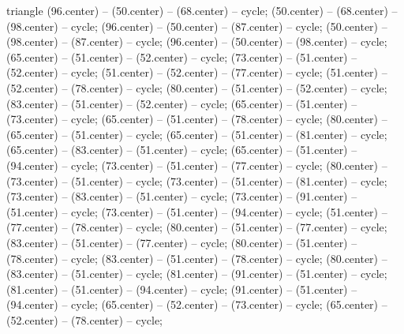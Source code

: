 \begin{pgfonlayer}{triangle}
 (96.center) -- (50.center) -- (68.center) -- cycle; 
 (50.center) -- (68.center) -- (98.center) -- cycle; 
 (96.center) -- (50.center) -- (87.center) -- cycle; 
 (50.center) -- (98.center) -- (87.center) -- cycle; 
 (96.center) -- (50.center) -- (98.center) -- cycle; 
 (65.center) -- (51.center) -- (52.center) -- cycle; 
 (73.center) -- (51.center) -- (52.center) -- cycle; 
 (51.center) -- (52.center) -- (77.center) -- cycle; 
 (51.center) -- (52.center) -- (78.center) -- cycle; 
 (80.center) -- (51.center) -- (52.center) -- cycle; 
 (83.center) -- (51.center) -- (52.center) -- cycle; 
 (65.center) -- (51.center) -- (73.center) -- cycle; 
 (65.center) -- (51.center) -- (78.center) -- cycle; 
 (80.center) -- (65.center) -- (51.center) -- cycle; 
 (65.center) -- (51.center) -- (81.center) -- cycle; 
 (65.center) -- (83.center) -- (51.center) -- cycle; 
 (65.center) -- (51.center) -- (94.center) -- cycle; 
 (73.center) -- (51.center) -- (77.center) -- cycle; 
 (80.center) -- (73.center) -- (51.center) -- cycle; 
 (73.center) -- (51.center) -- (81.center) -- cycle; 
 (73.center) -- (83.center) -- (51.center) -- cycle; 
 (73.center) -- (91.center) -- (51.center) -- cycle; 
 (73.center) -- (51.center) -- (94.center) -- cycle; 
 (51.center) -- (77.center) -- (78.center) -- cycle; 
 (80.center) -- (51.center) -- (77.center) -- cycle; 
 (83.center) -- (51.center) -- (77.center) -- cycle; 
 (80.center) -- (51.center) -- (78.center) -- cycle; 
 (83.center) -- (51.center) -- (78.center) -- cycle; 
 (80.center) -- (83.center) -- (51.center) -- cycle; 
 (81.center) -- (91.center) -- (51.center) -- cycle; 
 (81.center) -- (51.center) -- (94.center) -- cycle; 
 (91.center) -- (51.center) -- (94.center) -- cycle; 
 (65.center) -- (52.center) -- (73.center) -- cycle; 
 (65.center) -- (52.center) -- (78.center) -- cycle; 

\end{pgfonlayer}
